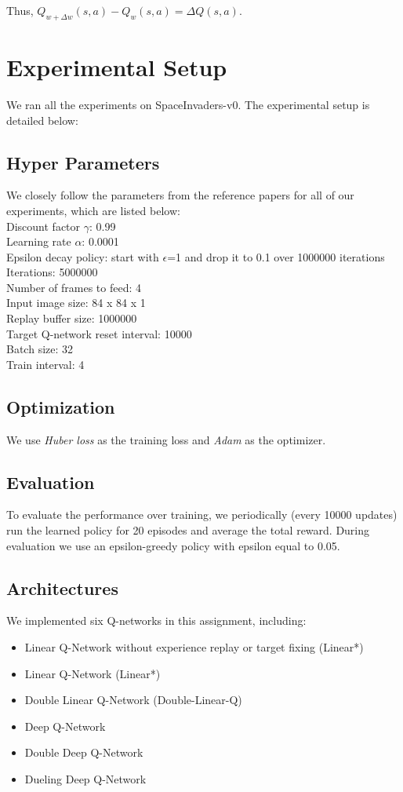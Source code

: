 \documentclass{article}
\begin{document}
Thus, $Q_{w+\Delta w}(s,a) - Q_{w}(s,a) = \Delta Q(s,a)$. 

\section{Experimental Setup}
We ran all the experiments on SpaceInvaders-v0. The experimental setup is detailed below:

\subsection{Hyper Parameters}
We closely follow the parameters from the reference papers for all of our experiments, which are listed below: \\

Discount factor $\gamma$: 0.99\\
Learning rate $\alpha$: 0.0001\\
Epsilon decay policy: start with $\epsilon$=1 and drop it to 0.1 over 1000000 iterations\\
Iterations: 5000000\\
Number of frames to feed: 4\\
Input image size: 84 x 84 x 1\\
Replay buffer size: 1000000\\
Target Q-network reset interval: 10000\\
Batch size: 32\\
Train interval: 4

\subsection{Optimization}
We use {\em Huber loss} as the training loss and {\em Adam} as the optimizer. 

\subsection{Evaluation} 
To evaluate the performance over training, we periodically (every 10000 updates) run the learned policy for 20 episodes and average the total reward. During evaluation we use an epsilon-greedy policy with epsilon equal to 0.05. 

\subsection{Architectures}

We implemented six Q-networks in this assignment, including:
\begin{itemize}
\item Linear Q-Network without experience replay or target fixing (Linear*)
\item Linear Q-Network (Linear*) 
\item Double Linear Q-Network (Double-Linear-Q)
\item Deep Q-Network
\item Double Deep Q-Network
\item Dueling Deep Q-Network
\end{itemize}
\end{document}

